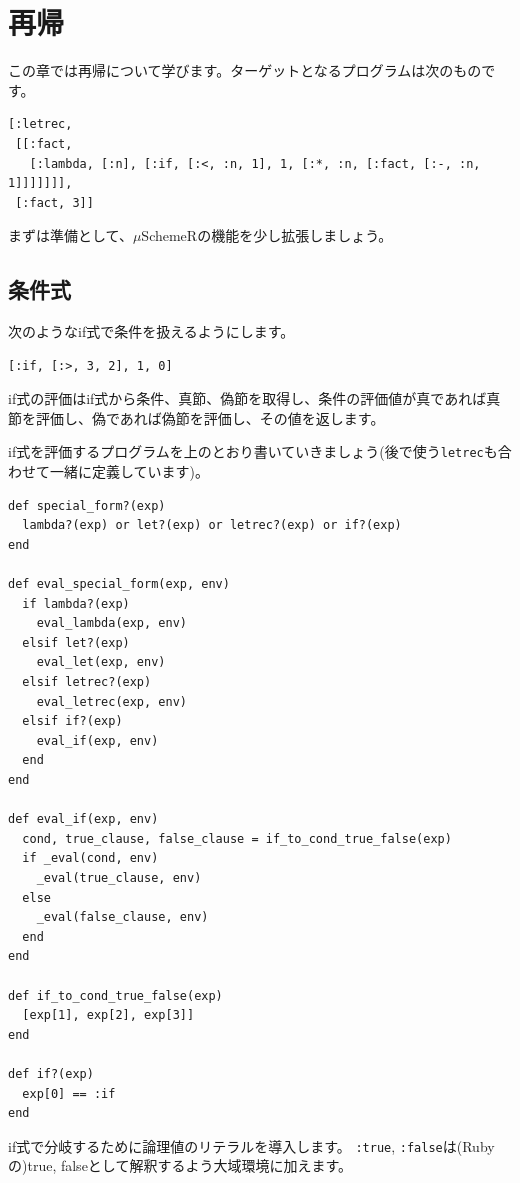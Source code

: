 \chapter{再帰\hspace{-3mm}}

この章では再帰について学びます。ターゲットとなるプログラムは次のものです。

\begin{lstlisting}
[:letrec, 
 [[:fact,
   [:lambda, [:n], [:if, [:<, :n, 1], 1, [:*, :n, [:fact, [:-, :n, 1]]]]]]], 
 [:fact, 3]]
\end{lstlisting}

まずは準備として、$\mu$SchemeRの機能を少し拡張しましょう。

\section{条件式}

次のようなif式で条件を扱えるようにします。

\begin{lstlisting}
[:if, [:>, 3, 2], 1, 0]
\end{lstlisting}

if式の評価はif式から条件、真節、偽節を取得し、条件の評価値が真であれば真節を評価し、偽であれば偽節を評価し、その値を返します。

if式を評価するプログラムを上のとおり書いていきましょう(後で使う{\tt letrec}も合わせて一緒に定義しています)。

\begin{lstlisting}
def special_form?(exp)
  lambda?(exp) or let?(exp) or letrec?(exp) or if?(exp)
end

def eval_special_form(exp, env)
  if lambda?(exp)
    eval_lambda(exp, env)
  elsif let?(exp)
    eval_let(exp, env)
  elsif letrec?(exp)
    eval_letrec(exp, env)
  elsif if?(exp)
    eval_if(exp, env)
  end
end

def eval_if(exp, env)
  cond, true_clause, false_clause = if_to_cond_true_false(exp)
  if _eval(cond, env)
    _eval(true_clause, env)
  else
    _eval(false_clause, env)
  end
end

def if_to_cond_true_false(exp)
  [exp[1], exp[2], exp[3]]
end

def if?(exp)
  exp[0] == :if
end
\end{lstlisting}

if式で分岐するために論理値のリテラルを導入します。
{\tt :true}, {\tt :false}は(Rubyの)true, falseとして解釈するよう大域環境に加えます。


